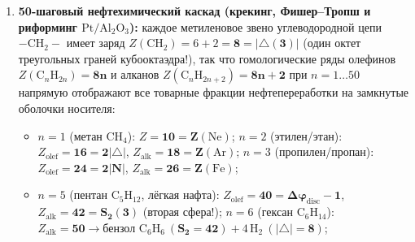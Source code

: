 \begin{enumerate}[label=\textbf{\arabic*.},leftmargin=*]
\begin{itemize}[noitemsep]
  \item суммарный заряд кофактора с молекулой азота $\mathrm{Fe_7MoS_9C + N_2}$ равен:
    \[
      7\times 26 + 42 + 9\times 16 + 6 + 14 \;=\; 374 + 14 \;=\; \mathbf{388 \;=\; 4 \times 97 \;=\; d_{\mathrm{in}}(\square)\cdot\hat{M}(3)},
    \]
    а после накопления 4 гидридных эквивалентов в состоянии Януса $E_4$ ($\mathrm{Fe_7MoS_9C + 4H + N_2}$) равен $388 + 4 = \mathbf{392 = 8 \times 49 = |{\triangle}(3)|\cdot d_{\mathrm{out}}(V)^2}$!
  \item на первых трёх шагах накопления $E_1, E_2, E_3$ ($a_k = 41k \in \{41, 82, 123\} < Q_\square = 128$) связывающая проекция $\mathcal{C}_3(a_k)\in\{+87, +46, +5\} > 0$ и знаменатель импеданса $D(E_3) = +39\,964 > 0$ остаются строго положительными (связь $\mathrm{N\equiv N}$ не рвётся). Ровно на \textbf{4-м шаге $E_4$ (состояние Януса, $a_4 = 4\times 41 = 164 > 128$)} проекция меняет знак на антисвязывающую ($\mathcal{C}_3(164) = -36 < 0$), а сырой знаменатель импеданса переходит через нулевой полюс в отрицательную резонансную область ($D_{\mathrm{raw}}(E_4) = \mathbf{-43\,184 < 0}$), вызывая восстановительный сброс $\mathrm{H_2}$, разрыв $\mathrm{N\equiv N}$ на шагах $E_5, E_6$ ($\mathcal{E}_{\mathrm{bond}} = -47, -71 < 0$) и выход через $\mathcal{C}_3(E_7 = 287) = \mathbf{-97 = -\hat{M}(3)}$!
  \end{itemize}
\item \textbf{50-шаговый нефтехимический каскад (крекинг, Фишер--Тропш и риформинг $\mathrm{Pt}/\mathrm{Al_2O_3}$):}
  каждое метиленовое звено углеводородной цепи $\mathrm{-CH_2-}$ имеет заряд $Z(\mathrm{CH_2}) = 6 + 2 = \mathbf{8 = |{\triangle}(3)|}$ (один октет треугольных граней кубооктаэдра!), так что гомологические ряды олефинов $Z(\mathrm{C}_n\mathrm{H}_{2n}) = \mathbf{8n}$ и алканов $Z(\mathrm{C}_n\mathrm{H}_{2n+2}) = \mathbf{8n + 2}$ при $n = 1\dots 50$ напрямую отображают все товарные фракции нефтепереработки на замкнутые оболочки носителя:
  \begin{itemize}[noitemsep]
  \item $n=1$ (метан $\mathrm{CH_4}$): $Z = \mathbf{10 = Z(\mathrm{Ne})}$; $n=2$ (этилен/этан): $Z_{\mathrm{olef}} = \mathbf{16 = 2|{\triangle}|}$, $Z_{\mathrm{alk}} = \mathbf{18 = Z(\mathrm{Ar})}$; $n=3$ (пропилен/пропан): $Z_{\mathrm{olef}} = \mathbf{24 = 2|N|}$, $Z_{\mathrm{alk}} = \mathbf{26 = Z(\mathrm{Fe})}$;
  \item $n=5$ (пентан $\mathrm{C_5H_{12}}$, лёгкая нафта): $Z_{\mathrm{olef}} = \mathbf{40 = \Delta\varphi_{\mathrm{disc}}-1}$, $Z_{\mathrm{alk}} = \mathbf{42 = S_2(3)}$ (вторая сфера!); $n=6$ (гексан $\mathrm{C_6H_{14}}$): $Z_{\mathrm{alk}} = \mathbf{50} \to \text{бензол } \mathrm{C_6H_6}\ (\mathbf{S_2=42}) + 4\,\mathrm{H_2}\ (\mathbf{|{\triangle}|=8})$;

\end{itemize}
\end{enumerate}
